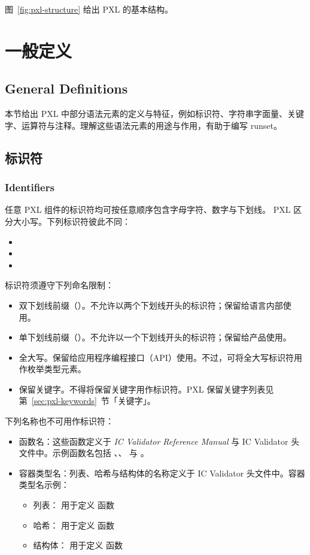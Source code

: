 图~\ref{fig:pxl-structure} 给出 PXL 的基本结构。


\section{一般定义}
\subsection*{General Definitions}

本节给出 PXL 中部分语法元素的定义与特征，例如标识符、字符串字面量、关键字、运算符与注释。理解这些语法元素的用途与作用，有助于编写 runset。

\subsection{标识符}
\subsubsection*{Identifiers}

任意 PXL 组件的标识符均可按任意顺序包含字母字符、数字与下划线。
PXL 区分大小写。下列标识符彼此不同：
\begin{itemize}
  \item {}
  \item {}
  \item {}
\end{itemize}

标识符须遵守下列命名限制：
\begin{itemize}
  \item 双下划线前缀（\cmd{\_\_}）。不允许以两个下划线开头的标识符；保留给语言内部使用。
  \item 单下划线前缀（\cmd{\_}）。不允许以一个下划线开头的标识符；保留给产品使用。
  \item 全大写。保留给应用程序编程接口（API）使用。不过，可将全大写标识符用作枚举类型元素。
  \item 保留关键字。不得将保留关键字用作标识符。PXL 保留关键字列表见第~\ref{sec:pxl-keywords}~节「关键字」。
\end{itemize}

下列名称也不可用作标识符：
\begin{itemize}
  \item 函数名：这些函数定义于 \textit{IC Validator Reference Manual} 与 IC Validator 头文件中。示例函数名包括 、、 与 。
  \item 容器类型名：列表、哈希与结构体的名称定义于 IC Validator 头文件中。容器类型名示例：
  \begin{itemize}
    \item 列表： 用于定义  函数
    \item 哈希： 用于定义  函数
    \item 结构体： 用于定义  函数
  \end{itemize}
\end{itemize}

